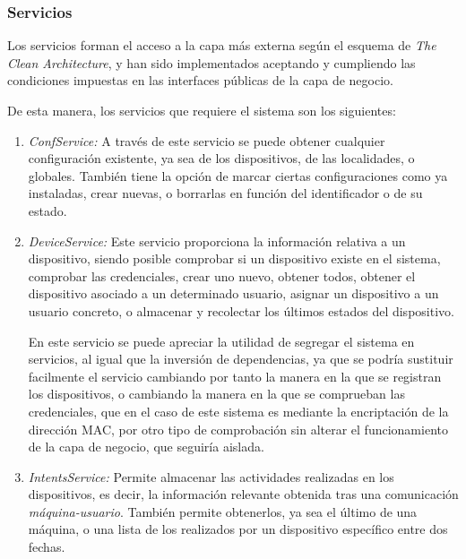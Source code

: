     \subsubsection{Servicios}
    
        Los servicios forman el acceso a la capa más externa según el esquema de \textit{The Clean Architecture}, y han sido implementados aceptando y cumpliendo las condiciones impuestas en las interfaces públicas de la capa de negocio.
        
        De esta manera, los servicios que requiere el sistema son los siguientes:
        \begin{enumerate}
            \item\textit{ConfService:}
            A través de este servicio se puede obtener cualquier configuración existente, ya sea de los dispositivos, de las localidades, o globales. También tiene la opción de marcar ciertas configuraciones como ya instaladas, crear nuevas, o borrarlas en función del identificador o de su estado.
            
            \item\textit{DeviceService:}
            Este servicio proporciona la información relativa a un dispositivo, siendo posible comprobar si un dispositivo existe en el sistema, comprobar las credenciales, crear uno nuevo, obtener todos, obtener el dispositivo asociado a un determinado usuario, asignar un dispositivo a un usuario concreto, o almacenar y recolectar los últimos estados del dispositivo.
            
            En este servicio se puede apreciar la utilidad de segregar el sistema en servicios, al igual que la inversión de dependencias, ya que se podría sustituir facilmente el servicio cambiando por tanto la manera en la que se registran los dispositivos, o cambiando la manera en la que se comprueban las credenciales, que en el caso de este sistema es mediante la encriptación de la dirección MAC, por otro tipo de comprobación sin alterar el funcionamiento de la capa de negocio, que seguiría aislada.
            
            \item\textit{IntentsService:}
            Permite almacenar las actividades realizadas en los dispositivos, es decir, la información relevante obtenida tras una comunicación \textit{máquina-usuario}. También permite obtenerlos, ya sea el último de una máquina, o una lista de los realizados por un dispositivo específico entre dos fechas.
            

\end{enumerate}
